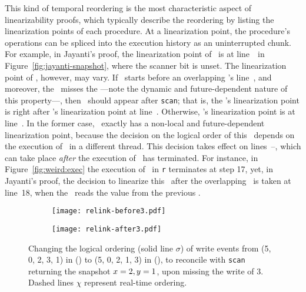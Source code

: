 \documentclass[a4paper,UKenglish]{lipics-v2016}
\newcommand{\hist}{\chi}
\def\ordlist{\sigma}
\theoremstyle{definition}
\begin{document}
This kind of temporal reordering is the most characteristic aspect of
linearizability proofs, which typically describe the reordering by
listing the linearization points of each procedure. At a linearization
point, the procedure's operations can be spliced into the execution
history as an uninterrupted chunk. For example, in Jayanti's proof,
the linearization point of \jyscan~is at line~\lineScanUnsetsS\ in
Figure~\ref{fig:jayanti-snapshot}, where the scanner bit is unset. The
linearization point of \jywrite, however, may vary. If
\jywrite~starts before an overlapping \jyscan's line~\lineScanUnsetsS,
and moreover, the \jyscan~misses the \jywrite---note the dynamic and
future-dependent nature of this property---, then \jywrite~should
appear after {\tt scan}; that is, the \jywrite's linearization point
is right after \jyscan's linearization point at line~\lineScanUnsetsS.
%
Otherwise, \jywrite's linearization point is at line~\lineWrtWrt.
%
In the former case, \jywrite~exactly has a non-local and
future-dependent linearization point, because the decision on the
logical order of this \jywrite~depends on the execution of \jyscan~in
a different thread. This decision takes effect on
lines~\lineScanReadsFX--\lineScanReadsFY, which can take place
\emph{after} the execution of \jywrite~has terminated.
%
For instance, in Figure~\ref{fig:weird:exec} the execution
of \jywrite~in \texttt{r} terminates at step 17, yet, in Jayanti's
proof, the decision to linearize this \jywrite\ after the
overlapping \jyscan\ is taken at line~18, when the \jyscan\ reads the
value from the previous \jywrite.

%

\begin{figure}[t]
\begin{subfigure}[t]{0.49\textwidth}
\texttt{[image: relink-before3.pdf]}
\caption{\label{fig:reorder:before}} %
\end{subfigure} \hfill
\begin{subfigure}[t]{0.49\textwidth}
\texttt{[image: relink-after3.pdf]}
\caption{\label{fig:reorder:after}} %
\end{subfigure}%
%
\caption{\label{fig:reorder} Changing the logical ordering (solid line
  $\ordlist$) of write events from (5, 0, 2, 3, 1) in
  () to (5, 0, 2, 1, 3) in
  (), to reconcile with {\tt scan} returning
  the snapshot $x=2, y=1$, upon missing the write of $3$. Dashed
  lines $\hist$ represent real-time ordering.}
\end{figure}
\end{document}

